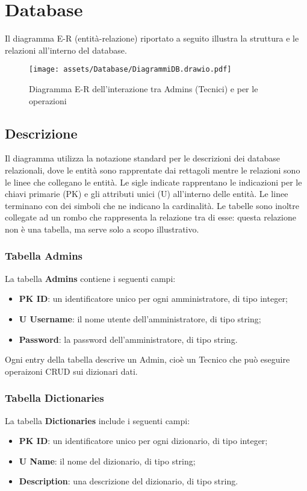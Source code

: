 \section{Database}

Il diagramma E-R (entità-relazione) riportato a seguito illustra la struttura e le relazioni all'interno del database.

\begin{figure}[H]
    \centering
    \texttt{[image: assets/Database/DiagrammiDB.drawio.pdf]}
    \caption{Diagramma E-R dell'interazione tra Admins (Tecnici) e  per le operazioni }
\end{figure}

\subsection{Descrizione}
Il diagramma utilizza la notazione standard per le descrizioni dei database relazionali, dove le entità sono rapprentate dai rettagoli mentre le relazioni sono le linee che collegano le entità. Le sigle indicate rapprentano le indicazioni per le chiavi primarie (PK) e gli attributi unici (U) all'interno delle entità. Le linee terminano con dei simboli che ne indicano la cardinalità. Le tabelle sono inoltre collegate ad un rombo che rappresenta la relazione tra di esse: questa relazione non è una tabella, ma serve solo a scopo illustrativo.

\subsubsection{Tabella Admins}
La tabella \textbf{Admins} contiene i seguenti campi:
\begin{itemize}
    \item \textbf{PK ID}: un identificatore unico per ogni amministratore, di tipo integer;
    \item \textbf{U Username}: il nome utente dell'amministratore, di tipo string;
    \item \textbf{Password}: la password dell'amministratore, di tipo string.
\end{itemize}
Ogni entry della tabella descrive un Admin, cioè un Tecnico che può eseguire operaizoni CRUD sui dizionari dati.

\subsubsection{Tabella Dictionaries}
La tabella \textbf{Dictionaries} include i seguenti campi:
\begin{itemize}
    \item \textbf{PK ID}: un identificatore unico per ogni dizionario, di tipo integer;
    \item \textbf{U Name}: il nome del dizionario, di tipo string;
    \item \textbf{Description}: una descrizione del dizionario, di tipo string.
\end{itemize}

